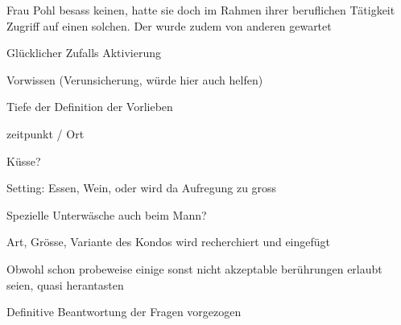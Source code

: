 Frau Pohl besass keinen, hatte sie doch im Rahmen ihrer beruflichen Tätigkeit Zugriff auf einen solchen. Der wurde zudem von anderen gewartet


Glücklicher Zufalls Aktivierung

Vorwissen (Verunsicherung, würde hier auch helfen)

Tiefe der Definition der Vorlieben

zeitpunkt / Ort 

Küsse?

Setting: Essen, Wein, oder wird da Aufregung zu gross

Spezielle Unterwäsche auch beim Mann?

Art, Grösse, Variante des Kondos wird recherchiert und eingefügt


Obwohl schon probeweise einige sonst nicht akzeptable berührungen erlaubt seien, quasi herantasten

Definitive Beantwortung der Fragen vorgezogen

\hfill {}
\newpage
 

